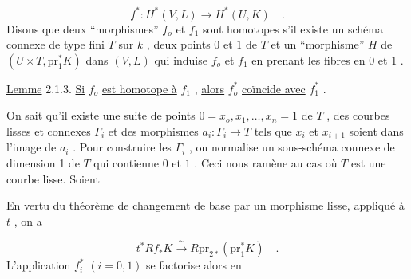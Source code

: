 \begin{equation*}
f^* : H^*(V,L) \longrightarrow H^*(U,K) \quad .
\end{equation*}
Disons que deux ``morphismes'' $f_o$ et $f_1$ sont homotopes s'il existe un schéma connexe de type fini $T$ sur $k$ , deux points $0$ et $1$ de $T$ et un ``morphisme'' $H$ de $(U \times T , \mathrm{pr}_1^* K)$ dans $(V,L)$ qui induise $f_o$ et $f_1$ en prenant les fibres en $0$ et $1$ .

\underline{Lemme} 2.1.3. \underline{Si} $f_o$ \underline{est homotope à} $f_1$ , \underline{alors} $f_o^*$ \underline{coïncide avec} $f_1^*$ .

On sait qu'il existe une suite de points $0 = x_o,x_1,\ldots,x_n = 1$ de $T$ , des courbes lisses et connexes $\Gamma_i$ et des morphismes $a_i : \Gamma_i \to T$ tels que $x_i$ et $x_{i+1}$ soient dans l'image de $a_i$ . Pour construire les $\Gamma_i$ , on normalise un sous-schéma connexe de dimension 1 de $T$ qui contienne $0$ et $1$ . Ceci nous ramène au cas où $T$ est une courbe lisse. Soient

\begin{center}
\end{center}
En vertu du théorème de changement de base par un morphisme lisse, appliqué à $t$ , on a

\begin{equation*}
t^*Rf_* K \xrightarrow{\ \sim\ } R\mathrm{pr}_{2*} (\mathrm{pr}_1^* K) \quad .
\end{equation*}
L'application $f_i^*$ $(i = 0,1)$ se factorise alors en

